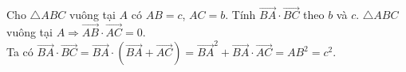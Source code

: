 \begin{bt}%
	Cho $\triangle ABC$ vuông tại $A$ có $AB=c$, $AC=b$. Tính $\overrightarrow{BA}\cdot \overrightarrow{BC}$ theo $b$ và $c$.
	\loigiai
	{
		$\triangle ABC$ vuông tại $A\Rightarrow \overrightarrow{AB}\cdot\overrightarrow{AC}=0$.\\
		Ta có $\overrightarrow{BA}\cdot \overrightarrow{BC}=\overrightarrow{BA}\cdot\left (\overrightarrow{BA}+\overrightarrow{AC} \right )=\overrightarrow{BA}^2+\overrightarrow{BA}\cdot\overrightarrow{AC}=AB^2=c^2$.
	} 
\end{bt}



